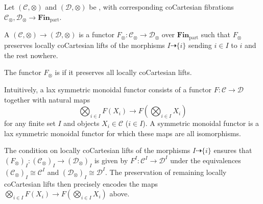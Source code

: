 \begin{definition} \label{definition:lax_symmetric_monoidal_functor_of_symmetric_monoidal_infinity_categories}
Let $(\mathcal{C}, \otimes)$ and $(\mathcal{D}, \otimes)$ be , with corresponding coCartesian fibrations $\mathcal{C}_\otimes, \mathcal{D}_\otimes \to \mathbf{Fin}_{\mathrm{part}}$.

A  $(\mathcal{C}, \otimes) \to (\mathcal{D}, \otimes)$ is a functor $F_\otimes : \mathcal{C}_\otimes \to \mathcal{D}_\otimes$ over $\mathbf{Fin}_{\mathrm{part}}$ such that $F_\otimes$ preserves locally coCartesian lifts of the morphisms $I \dashrightarrow \{i\}$ sending $i \in I$ to $i$ and the rest nowhere.

The functor $F_\otimes$ is  if it preserves all locally coCartesian lifts.

Intuitively, a lax symmetric monoidal functor consists of a functor $F : \mathcal{C} \to \mathcal{D}$ together with natural maps
\[ \bigotimes_{i \in I} F(X_i) \to F\left(\bigotimes_{i \in I} X_i\right) \]
for any finite set $I$ and objects $X_i \in \mathcal{C}$ ($i \in I$). A symmetric monoidal functor is a lax symmetric monoidal functor for which these maps are all isomorphisms.

The condition on locally coCartesian lifts of the morphisms $I \dashrightarrow \{i\}$ ensures that $(F_\otimes)_I : (\mathcal{C}_\otimes)_I \to (\mathcal{D}_\otimes)_I$ is given by $F^I : \mathcal{C}^I \to \mathcal{D}^I$ under the equivalences $(\mathcal{C}_\otimes)_I \cong \mathcal{C}^I$ and $(\mathcal{D}_\otimes)_I \cong \mathcal{D}^I$. The preservation of remaining locally coCartesian lifts then precisely encodes the maps $\bigotimes_{i \in I} F(X_i) \to F(\bigotimes_{i \in I} X_i)$ above.
\end{definition}
